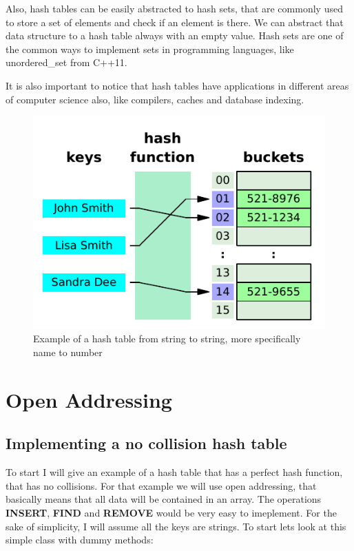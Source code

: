Also, hash tables can be easily abstracted to hash sets, that are commonly used to store a set of elements and check if an element is there. We can abstract that data structure to a hash table always with an empty value. Hash sets are one of the common ways to implement sets in programming languages, like unordered\_set from C++11.

It is also important to notice that hash tables have applications in different areas of computer science also, like compilers, caches and database indexing.


\begin{figure}[h!]
  \centering
  \includegraphics[width=12cm]{figuras/hash-table.pdf}
  \caption{Example of a hash table from string to string, more specifically name to number}
\end{figure}

\newpage

\section{Open Addressing}

\subsection{Implementing a no collision hash table}

To start I will give an example of a hash table that has a perfect hash function, that has no collisions. For that example we will use open addressing, that basically means that all data will be contained in an array. The operations \textbf{INSERT}, \textbf{FIND} and \textbf{REMOVE} would be very easy to imeplement. For the sake of simplicity, I will assume all the keys are strings. To start lets look at this simple class with dummy methods:

